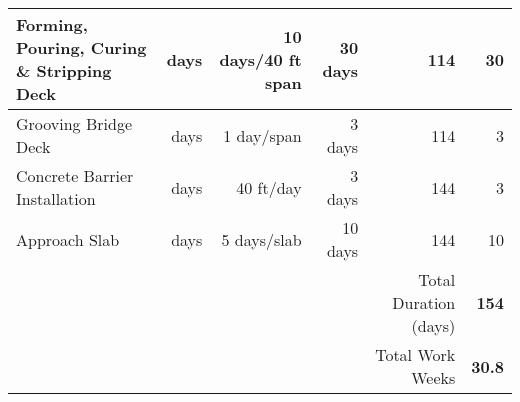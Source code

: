 \begin{table}[H]
{\begin{tabular}{lrrrrr}
Forming, Pouring, Curing \& Stripping Deck & days                  & 10 days/40 ft span\footnotemark& 30 days            & 114                       & 30                                 \\ \midrule
Grooving Bridge Deck                       & days                  & 1 day/span               & 3 days             & 114                       & 3                                   \\ \midrule
Concrete Barrier Installation              & days                  & 40 ft/day                & 3 days             & 144                       & 3                                    \\ \midrule
Approach Slab                              & days                  & 5 days/slab              & 10 days            & 144                       & 10                                    \\ \midrule\bottomrule
                                           &                       &                          &                    & Total Duration (days)     & \textbf{154}                           \\
                                           &                       &                          &                    & Total Work Weeks          & \textbf{30.8}                           \\ \bottomrule\bottomrule
\end{tabular}}
\end{table}

